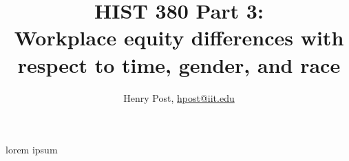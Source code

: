 \documentclass[a4paper,12pt]{article}
\title{HIST 380 Part 3: \\ Workplace equity differences with \\ respect to time, gender, and race }
\author{Henry Post, \url{hpost@iit.edu}}
\begin{document}
\maketitle

\newpage

lorem ipsum

\newpage

\begin{thebibliography}{9}


\end{thebibliography}

\newpage

\end{document}
